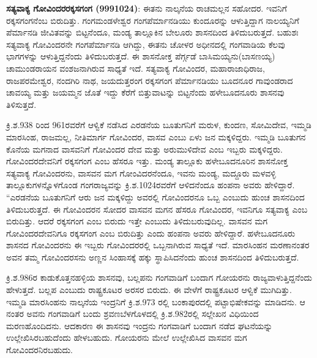 \textbf{ ಸತ್ಯವಾಕ್ಯ ಗೋವಿಂದರ\general{\enginline{-}}ರಕ್ಕಸಗಂಗ (999\general{\enginline{-}}1024)}: ಈತನು ನಾಲ್ಕನೆಯ ರಾಚಮಲ್ಲನ ಸಹೋದರ. ಇವನಿಗೆ ರಕ್ಕಸಗಂಗನೆಂಬ ಬಿರುದಿತ್ತು. ಗಂಗಮಂಡಳೇಶ್ವರ ಗಂಗಪೆರ್ಮಾನಡಿಯು ಕುಂದೂರನ್ನು ಆಳುತ್ತಿದ್ದಾಗ ನಾಲಯ್ಯನಿಗೆ ಪೆರ್ಮಾನಡಿ ಜೀವಿತವನ್ನು ಬಿಟ್ಟನೆಂದೂ, ಮಂಡ್ಯ ತಾಲ್ಲೂಕಿನ ಬೇಲೂರು ಶಾಸನದಿಂದ ತಿಳಿದುಬರುತ್ತದೆ. ಬಹುಶಃ ಸತ್ಯವಾಕ್ಯ ಗೋವಿಂದರನೇ ಗಂಗಪೆರ್ಮಾನಡಿ ಆಗಿದ್ದು, ಈತನು ಚೋಳರ ಅಧೀನದಲ್ಲಿ ಗಂಗವಾಡಿಯ ಕೆಲವು ಭಾಗಗಳನ್ನು ಆಳುತ್ತಿದ್ದನೆಂದು ತಿಳಿದುಬರುತ್ತದೆ. ಈ ಶಾಸನೋಕ್ತ ಪೆರ್ಗ್ಗಡೆ ಬಾಸಿಮಯ್ಯನು(ಬಾಸಣಯ್ಯ) ಚಾಮುಂಡರಾಯನ ವಂಶಜನಾಗಿರುವ ಸಾಧ್ಯತೆ ಇದೆ. ಸತ್ಯವಾಕ್ಯ ಗೋವಿಂದರ, ಮಹಾರಾಜಾಧಿರಾಜ, ರಾಜಪರಮೇಶ್ವರ, ನಂದಗಿರಿ ನಾಥ, ಜಯದುತ್ತರಂಗ ರಕ್ಕಸಗಂಗ ಪೆರ್ಮಾನಡಿಯು ಬೂದನೂರ ಗಾವುಂಡರಾದ ಚಾವಯ್ಯ ಮತ್ತು ಜಯಮ್ಮನ ಜೊತೆ ಇದ್ದು ಕೆರೆಗೆ ಬಿತ್ತುವಾಟನ್ನು ಬಿಟ್ಟನೆಂದು ಹಳೇಬೂದನೂರು ಶಾಸನವು ತಿಳಿಸುತ್ತದೆ.

ಕ್ರಿ.ಶ.938 ರಿಂದ 961ರವರೆಗೆ ಆಳ್ವಿಕೆ ನಡೆಸಿದ ಎರಡನೆಯ ಬೂತುಗನಿಗೆ ಮರುಳ, ಕುಂದಣ, ಸೋಮಿದೇವ, ಇಮ್ಮಡಿ ಮಾರಸಿಂಹ, ರಾಜಮಲ್ಲ, ನೀತಿಮಾರ್ಗ ಗೋವಿಂದರ, ವಾಸವ ಎಂಬು ಏಳು ಜನ ಮಕ್ಕಳಿದ್ದರು. ಇಮ್ಮಡಿ ಬೂತುಗನ ಕೊನೆಯ ಮಗನಾದ ವಾಸವನಿಗೆ ಗೋವಿಂದರ ದೇವ ಮತ್ತು ಅರುಮುಳಿದೇವ ಎಂಬ ಇಬ್ಬರು ಮಕ್ಕಳಿದ್ದರು. ಗೋವಿಂದರದೇವನಿಗೆ ರಕ್ಕಸಗಂಗ ಎಂಬ ಹೆಸರೂ ಇತ್ತು. ಮಂಡ್ಯ ತಾಲ್ಲೂಕು ಹಳೇಬೂದನೂರಿನ ಶಾಸನೋಕ್ತ ಸತ್ಯವಾಕ್ಯ ಗೋವಿಂದರನು, ವಾಸವನ ಮಗ ಗೋಂವಿದರನೆಂದೂ, ಇವನು ಮಂಡ್ಯ, ಮದ್ದೂರು ಮಳವಳ್ಳಿ ತಾಲ್ಲೂಕುಗಳನ್ನೊಳಗೊಂಡ ಗಂಗರಾಜ್ಯವನ್ನು ಕ್ರಿ.ಶ.1024ರವರೆಗೆ ಆಳಿದನೆಂದೂ ಹಂಪನಾ ಅವರು ಹೇಳಿದ್ದಾರೆ. “ಎರಡನೆಯ ಬೂತುಗನಿಗೆ ಆರು ಜನ ಮಕ್ಕಳಿದ್ದು ಅವರಲ್ಲಿ ಗೋವಿಂದರನೂ ಒಬ್ಬ ಎಂಬುದು ಹುಂಚ ಶಾಸನದಿಂದ ತಿಳಿದುಬರುತ್ತದೆ. ಈ ಗೋವಿಂದರನ ಸೋದರ ವಾಸವನ ಮಗನ ಹೆಸರೂ ಗೋವಿಂದರ, ಇವನಿಗೂ ಸತ್ಯವಾಕ್ಯ ಎಂಬ ಬಿರುದಿತ್ತು. ಆದರೆ ರಕ್ಕಸಗಂಗ ಎಂಬ ಬಿರುದು ಇತ್ತೇ ಎಂಬುದು ತಿಳಿದುಬರುವುದಿಲ್ಲ. ವಾಸವನ ಮಗ ಗೋವಿಂದರದೇವನಿಗೂ ರಕ್ಕಸಗಂಗ ಎಂಬ ಬಿರುದಿತ್ತು ಎಂದು ಹಂಪನಾ ಅವರು ಹೇಳಿದ್ದಾರೆ. ಹಳೇಬೂದನೂರು ಶಾಸನದ ಗೋವಿಂದರನು ಈ ಇಬ್ಬರು ಗೋವಿಂದರರಲ್ಲಿ ಒಬ್ಬನಾಗಿರುವ ಸಾಧ್ಯತೆ ಇದೆ. ಮಾರಸಿಂಹನ ಮರಣಾನಂತರ ಅವನ ತಮ್ಮ ಗೋವಿಂದರಸನು ಅಣ್ಣನ ಸಿಂಹಾಸಕ್ಕೆ ಹಕ್ಕು ಸ್ಥಾಪಿಸಿದನೆಂದು ಹುಂಚ ಶಾಸನದಿಂದ ತಿಳಿದುಬರುತ್ತದೆ.

ಕ್ರಿ.ಶ.986ರ ಕಾಡುಕೊತ್ತನಹಳ್ಳಿಯ ಶಾಸನವು, ಬಲ್ಲಪನು ಗಂಗವಾಡಿಗೆ ಬಂದಾಗ ಗೋಯರನು ರಾಜ್ಯವಾಳುತ್ತಿದ್ದ\-ನೆಂದು ಹೇಳುತ್ತದೆ. ಬಲ್ಲಪ ಎಂಬುದು ರಾಷ್ಟ್ರಕೂಟರ ಅರಸರ ಬಿರುದು. ಈ ವೇಳೆಗೆ ರಾಷ್ಟ್ರಕೂಟರ ಆಳ್ವಿಕೆ ಮುಗಿದಿತ್ತು. ಇಮ್ಮಡಿ ಮಾರಸಿಂಹನು ನಾಲ್ಕನೆಯ ಇಂದ್ರನಿಗೆ ಕ್ರಿ.ಶ.973 ರಲ್ಲಿ ಬಂಕಾಪುರದಲ್ಲಿ ಪಟ್ಟಾಭಿಷೇಕವನ್ನು ಮಾಡಿದನು. ಆ ನಂತರ ಅವನು ಗಂಗವಾಡಿಗೆ ಬಂದು ಶ್ರವಣಬೆಳಗೊಳದಲ್ಲಿ ಕ್ರಿ.ಶ.982ರಲ್ಲಿ ಸಲ್ಲೇಖನ ವಿಧಿಯಿಂದ ಮರಣಹೊಂದಿದನು. ಆದಕಾರಣ ಈ ಶಾಸನವು ಇಂದ್ರನು ಗಂಗವಾಡಿಗೆ ಬಂದಾಗ ನಡೆದ ಘಟನೆಯನ್ನು ಉಲ್ಲೇಖಿಸಿರಬಹುದೆಂದು ಹೇಳಬಹುದು. ಗೋಯರನು ಮೇಲೆ ಉಲ್ಲೇಖಿಸಿದ ವಾಸವನ ಮಗ ಗೋವಿಂದರನಿರಬಹುದು.

